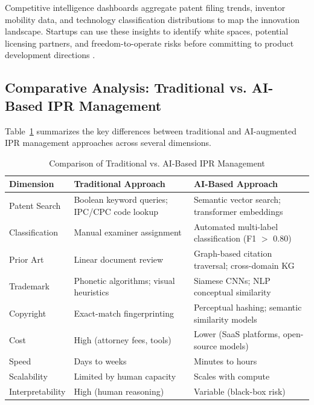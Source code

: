 \documentclass[conference]{IEEEtran}
\begin{document}
Competitive intelligence dashboards aggregate patent filing trends, inventor mobility data, and technology classification distributions to map the innovation landscape. Startups can use these insights to identify white spaces, potential licensing partners, and freedom-to-operate risks before committing to product development directions \cite{ref25}.

\subsection{Comparative Analysis: Traditional vs. AI-Based IPR Management}

Table~\ref{tab:comparison} summarizes the key differences between traditional and AI-augmented IPR management approaches across several dimensions.

\begin{table}[htbp]
\caption{Comparison of Traditional vs. AI-Based IPR Management}
\label{tab:comparison}
\begin{center}
\begin{tabular}{>{\raggedright}p{1.8cm} >{\raggedright}p{2.8cm} >{\raggedright\arraybackslash}p{2.8cm}}
\toprule
\textbf{Dimension} & \textbf{Traditional Approach} & \textbf{AI-Based Approach} \\
\midrule
Patent Search & Boolean keyword queries; IPC/CPC code lookup & Semantic vector search; transformer embeddings \\
\addlinespace
Classification & Manual examiner assignment & Automated multi-label classification (F1 $>$ 0.80) \\
\addlinespace
Prior Art & Linear document review & Graph-based citation traversal; cross-domain KG \\
\addlinespace
Trademark & Phonetic algorithms; visual heuristics & Siamese CNNs; NLP conceptual similarity \\
\addlinespace
Copyright & Exact-match fingerprinting & Perceptual hashing; semantic similarity models \\
\addlinespace
Cost & High (attorney fees, tools) & Lower (SaaS platforms, open-source models) \\
\addlinespace
Speed & Days to weeks & Minutes to hours \\
\addlinespace
Scalability & Limited by human capacity & Scales with compute \\
\addlinespace
Interpretability & High (human reasoning) & Variable (black-box risk) \\
\bottomrule
\end{tabular}
\end{center}
\end{table}
\end{document}
